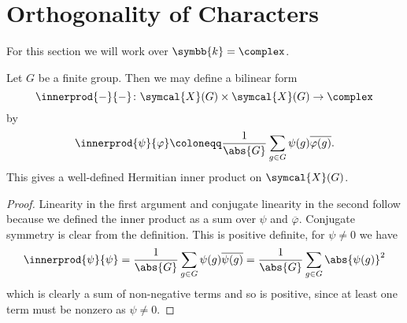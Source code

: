 \documentclass[fleqn]{NotesClass}
\renewcommand{\field}{\symbb{k}}
\newcommand{\classFunctions}{\symcal{X}}
\begin{document}
    \section{Orthogonality of Characters}
    For this section we will work over \(\field = \complex\).
    
    \begin{lma}{}{}
        Let \(G\) be a finite group.
        Then we may define a bilinear form
        \begin{equation}
            \innerprod{-}{-} \colon \classFunctions(G) \times \classFunctions(G) \to \complex
        \end{equation}
        by
        \begin{equation}
            \innerprod{\psi}{\varphi} \coloneqq \frac{1}{\abs{G}} \sum_{g \in G} \psi(g) \overline{\varphi(g)}.
        \end{equation}
        This gives a well-defined Hermitian inner product on \(\classFunctions(G)\).
        \begin{proof}
            Linearity in the first argument and conjugate linearity in the second follow because we defined the inner product as a sum over \(\psi\) and \(\overline{\varphi}\).
            Conjugate symmetry is clear from the definition.
            This is positive definite, for \(\psi \ne 0\) we have
            \begin{equation}
                \innerprod{\psi}{\psi} = \frac{1}{\abs{G}} \sum_{g \in G} \psi(g)\overline{\psi(g)} = \frac{1}{\abs{G}} \sum_{g \in G} \abs{\psi(g)}^2
            \end{equation}
            which is clearly a sum of non-negative terms and so is positive, since at least one term must be nonzero as \(\psi \ne 0\).
        \end{proof}
    \end{lma}
    
\end{document}
